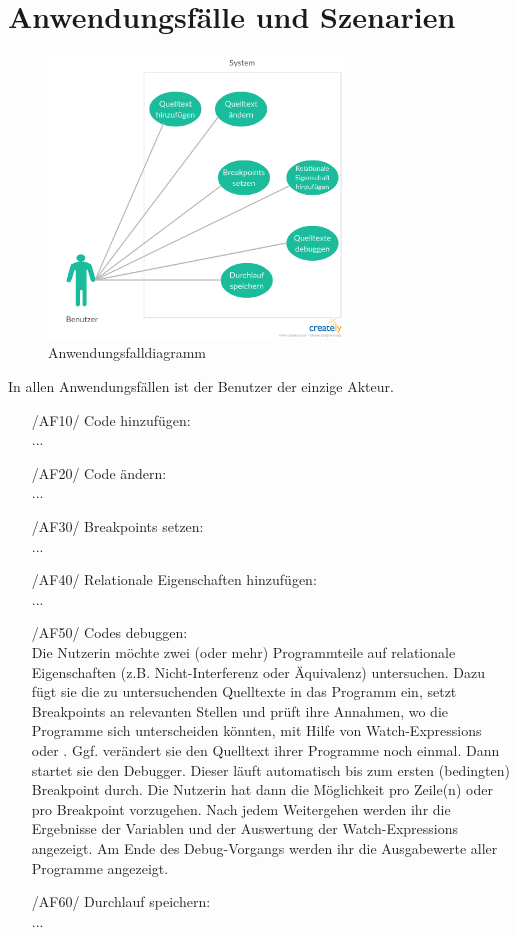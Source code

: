 \documentclass[parskip=full]{scrartcl}
\let\glsplgen\glsuseri
\begin{document}
\section{Anwendungsfälle und Szenarien}
\begin{figure}[h] 
  \centering
     \includegraphics[width=0.7\textwidth]{Anwendungsfalldiagramm}
  \caption{Anwendungsfalldiagramm}
  \label{fig:Bild1}
\end{figure}

In allen Anwendungsfällen ist der Benutzer der einzige Akteur.

\begin{itemize}
		\item[/AF10/] Code hinzufügen: \\ ...
		\item[/AF20/] Code ändern: \\ ...
		\item[/AF30/] Breakpoints setzen: \\...
		\item[/AF40/] Relationale Eigenschaften hinzufügen: \\...
		\item[/AF50/] Codes debuggen: \\
				Die Nutzerin möchte zwei (oder mehr) Programmteile auf relationale Eigenschaften (z.B. Nicht-Interferenz oder Äquivalenz) untersuchen. Dazu fügt sie die zu untersuchenden Quelltexte in das Programm ein, setzt \glspl{Breakpoint} an relevanten Stellen und prüft ihre Annahmen, wo die Programme sich unterscheiden könnten, mit Hilfe von \glspl{Watch-Expression} oder \glsplgen{bedingter Breakpoint}. Ggf. verändert sie den Quelltext ihrer Programme noch einmal. Dann startet sie den \gls{Debugger}. Dieser läuft automatisch bis zum ersten (bedingten) \gls{Breakpoint} durch. Die Nutzerin hat dann die Möglichkeit pro Zeile(n) oder pro Breakpoint vorzugehen. Nach jedem Weitergehen werden ihr die Ergebnisse der Variablen und der Auswertung der \glspl{Watch-Expression} angezeigt. Am Ende des Debug-Vorgangs werden ihr die Ausgabewerte aller Programme angezeigt.
		\item[/AF60/] Durchlauf speichern: \\ ...

\end{itemize}
\end{document}
